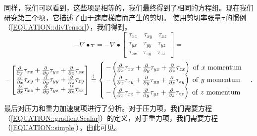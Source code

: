 \documentclass[LBMDerivation.tex]{subfiles}
\begin{document}
%
%
    同样，我们可以看到，这些项是相等的，我们最终得到了相同的方程组。现在我们研究第三个项，它描述了由于速度梯度而产生的剪切。 使用剪切率张量$\boldsymbol \tau$的惯例（\ref{EQUATION::divTensor}），我们得到。
%
%
\begin{equation*}
  -  \nabla \bullet \boldsymbol \tau
=
  -  \nabla \bullet
  \left[
  \begin{matrix}
  \tau_{xx} ~~~~ \tau_{xy} ~~~~ \tau_{xz} \\
  \tau_{yx} ~~~~ \tau_{yy} ~~~~ \tau_{yz} \\
  \tau_{zx} ~~~~ \tau_{zy} ~~~~ \tau_{zz}
  \end{matrix}
  \right]
=
\end{equation*}
\begin{equation*}
- \left[
  \begin{matrix}
  \frac{\partial}{\partial x}\tau_{xx} + \frac{\partial}{\partial y} \tau_{yx} + \frac{\partial}{\partial z} \tau_{zx} \\
  \frac{\partial}{\partial x}\tau_{xy} + \frac{\partial}{\partial y} \tau_{yy} + \frac{\partial}{\partial z}\tau_{zy} \\
  \frac{\partial}{\partial x}\tau_{xz} + \frac{\partial}{\partial y} \tau_{yz} + \frac{\partial}{\partial z} \tau_{zz}
  \end{matrix}
  \right]
\overset{!}{=}
  \begin{cases}
  -\left(
      \frac{\partial}{\partial x}  \tau_{xx}
      +\frac{\partial}{\partial y}  \tau_{yx}
      +\frac{\partial}{\partial z}  \tau_{zx}
  \right) ~ \mathrm{of~}x ~ \mathrm{momentum} \\
  -\left(
      \frac{\partial}{\partial x}  \tau_{xy}
      +\frac{\partial}{\partial y}  \tau_{yy}
      +\frac{\partial}{\partial z}  \tau_{zy}
  \right) ~ \mathrm{of~}y ~ \mathrm{momentum} \\
    -\left(
      \frac{\partial}{\partial x}  \tau_{xz}
      +\frac{\partial}{\partial y}  \tau_{yz}
      +\frac{\partial}{\partial z}  \tau_{zz}
  \right) ~ \mathrm{of~}z ~ \mathrm{momentum}
  \end{cases}
  .
\end{equation*}
%
%
    最后对压力和重力加速度项进行了分析。对于压力项，我们需要方程（\ref{EQUATION::gradientScalar}）的定义，对于重力项，我们需要方程（\ref{EQUATION::simple}）。由此可见。
%
%
\end{document}
